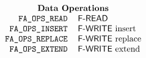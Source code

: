 
\normalsize
\[\begin{tabular}{rl}
    \multicolumn{2}{c}{\bf Data Operations}\\
    \tt FA\_OPS\_READ&		\sf F-READ\\
    \tt FA\_OPS\_INSERT&	{\sf F-WRITE\/} insert\\
    \tt FA\_OPS\_REPLACE&	{\sf F-WRITE\/} replace\\
    \tt FA\_OPS\_EXTEND&	{\sf F-WRITE\/} extend\\
\end{tabular}\]
